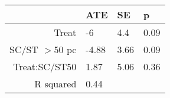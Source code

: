 \begin{tabular}{rlll}
  \hline
 & ATE & SE & p \\ 
  \hline
Treat & -6 & 4.4 & 0.09 \\ 
  SC/ST $>$50 pc & -4.88 & 3.66 & 0.09 \\ 
  Treat:SC/ST50 & 1.87 & 5.06 & 0.36 \\ 
  R squared & 0.44 &  &  \\ 
   \hline
\end{tabular}

